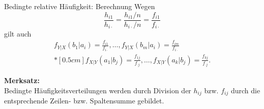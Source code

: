 \documentclass[
  10pt,
  ignorenonframetext,
]{beamer}
\begin{document}
\begin{frame}{Bedingte relative Häufigkeit: Berechnung}
\protect\hypertarget{bedingte-relative-huxe4ufigkeit-berechnung}{}
Wegen \begin{displaymath}
\frac{h_{i1}}{h_{i\cdot}} = \frac{h_{i1}/n}{h_{i\cdot}/n} = \frac{f_{i1}}{f_{i\cdot}}
\end{displaymath} gilt auch \begin{displaymath}
\begin{array}{c}
f_{Y|X}(b_1|a_i) = \frac{f_{i1}}{f_{i\cdot}} ,\ldots, f_{Y|X}(b_m|a_i) = \frac{f_{im}}{f_{i\cdot}} \\*[0.5cm]
f_{X|Y}(a_1|b_j) = \frac{f_{1j}}{f_{\cdot j}} ,\ldots, f_{X|Y}(a_k|b_j) = \frac{f_{kj}}{f_{\cdot j}}.
\end{array}
\end{displaymath}

\noindent \textbf{Merksatz:}\\
Bedingte Häufigkeitsverteilungen werden durch Division der \(h_{ij}\)
bzw. \(f_{ij}\) durch die entsprechende Zeilen- bzw. Spaltensumme
gebildet.
\end{frame}
\end{document}

